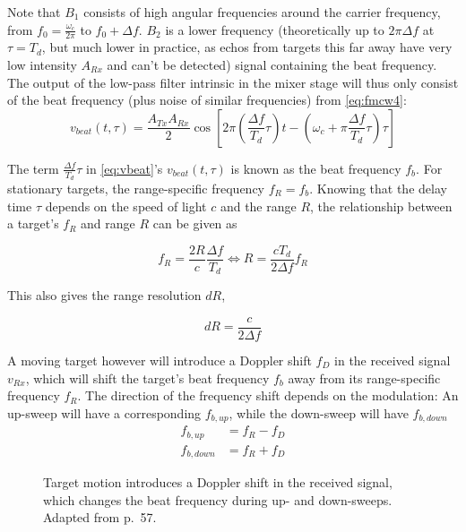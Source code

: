Note that \(B_1\) consists of high angular frequencies around the
carrier frequency, from \(f_0 = \frac{\omega_c}{2\pi}\) to
\(f_0 + \Delta f\). \(B_2\) is a lower frequency (theoretically up to
\(2\pi\Delta f\) at \(\tau = T_d\), but much lower in practice, as echos
from targets this far away have very low intensity \(A_{Rx}\) and can't
be detected) signal containing the beat frequency. The output of the
low-pass filter intrinsic in the mixer stage will thus only consist of
the beat frequency (plus noise of similar frequencies) from \cref{eq:fmcw4}:
\begin{equation} \label{eq:vbeat}
    v_{beat}(t,\tau) = \frac{A_{Tx}A_{Rx}}{2} \cos \left[ 2\pi\left(\frac{\Delta f}{T_d}\tau\right)t - \left(\omega_c + \pi\frac{\Delta f}{T_d}\tau \right) \tau \right]
\end{equation}

The term \(\frac{\Delta f}{T_d}\tau\) in \cref{eq:vbeat}'s \(v_{beat}(t,\tau)\) is
known as the beat frequency \(f_b\). For stationary targets, the
range-specific frequency \(f_R = f_b\). Knowing that the delay time
\(\tau\) depends on the speed of light \(c\) and the range \(R\), the
relationship between a target's \(f_R\) and range \(R\) can be given as

\begin{equation}\label{eq:range}
	f_R = \frac{2R}{c} \frac{\Delta f}{T_d} \iff R=\frac{c T_d}{2\Delta f}f_R
\end{equation}

This also gives the range resolution \(dR\),

\begin{equation} \label{eq:rangeres}
	dR = \frac{c}{2 \Delta f}
\end{equation}

A moving target however will introduce a Doppler shift \(f_D\) in the
received signal \(v_{Rx}\), which will shift the target's beat frequency
\(f_b\) away from its range-specific frequency \(f_R\). The direction of
the frequency shift depends on the modulation: An up-sweep will have a
corresponding $f_{b,up}$, while the down-sweep will have $f_{b,down}$
\begin{align}
	f_{b,up}    &= f_R - f_D \label{eq:vbeatup} \\
	f_{b,down}  &= f_R + f_D \label{eq:vbeatdn}
\end{align}

\begin{figure}[htbp]
    \centering
    \def\svgwidth{10cm}
    
    \caption{\label{fig:fmcw_doppler}Target motion introduces a Doppler shift in the received signal, which changes the beat frequency during up- and down-sweeps. Adapted from \cite{Adams2012} p.~57.}
\end{figure}

